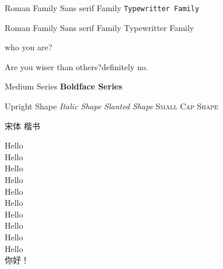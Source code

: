 \documentclass[10pt]{article}%
\newcommand{\myfont}{\songti{\zihao{-4}{针不戳}}}%
\begin{document}
	\textrm{Roman Family}	\textsf{Sans serif Family}	\texttt{Typewritter Family}
	
	{\rmfamily Roman Family}	{\sffamily Sans serif Family}	{\ttfamily Typewritter Family}		%
	
	\sffamily who you are?
	
	Are you wiser than others?definitely no.
	
	\textmd{Medium Series}	\textbf{Boldface Series}
	
	\textup{Upright Shape}	\textit{Italic Shape}
	\textsl{Slanted Shape}	\textsc{Small Cap Shape}
	
	{\songti 宋体} 	 \quad
	{\kaishu 楷书} 
	
	{\tiny			Hello}\\
	{\scriptsize	Hello}\\
	{\footnotesize	Hello}\\
	{\small			Hello}\\
	{\normalsize	Hello}\\
	{\large			Hello}\\
	{\Large 		Hello}\\
	{\LARGE 		Hello}\\
	{\huge			Hello}\\
	{\Huge			Hello}\\
	
	 你好！%
	
	\myfont				
	
\end{document}
